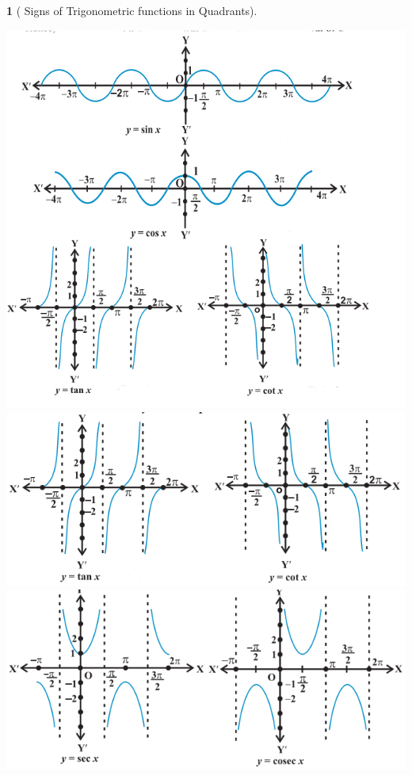 \documentclass[12pt]{article}
\theoremstyle{colored}
\theoremstyle{subcolored}
\newtheorem*{subdefn}{}
\begin{document}
\begin{multicols}{2}
\begin{subdefn}[  Signs of Trigonometric functions in Quadrants]
  \begin{center}
      \includegraphics[scale=0.4]{10.png}
      \includegraphics[scale=0.4]{11.png}
      \includegraphics[scale=0.4]{12.png}
  \end{center}
\end{subdefn}

\end{multicols}
\end{document}
